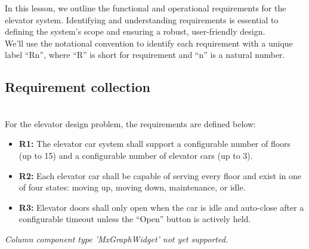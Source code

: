 

In this lesson, we outline the functional and operational requirements for the elevator system. Identifying and understanding requirements is essential to defining the system's scope and ensuring a robust, user-friendly design.
\\
We'll use the notational convention to identify each requirement with a unique label ``Rn'', where ``R'' is short for requirement and ``n'' is a natural number.

\subsection{Requirement collection}\label{T3-iWeexW0GlqHAyijyXI}
\\
For the elevator design problem, the requirements are defined below:

\noindent
\begin{minipage}[t]{0.48\textwidth}\vspace{0pt}
\begin{itemize}
\item
\textbf{R1:} The elevator car system shall support a configurable number of floors (up to 15) and a configurable number of elevator cars (up to 3).
\item
\textbf{R2:} Each elevator car shall be capable of serving every floor and exist in one of four states: moving up, moving down, maintenance, or idle.
\item
\textbf{R3:} Elevator doors shall only open when the car is idle and auto-close after a configurable timeout unless the ``Open'' button is actively held.
\end{itemize}
\end{minipage}
\hfill
\begin{minipage}[t]{0.48\textwidth}\vspace{0pt}
\textit{Column component type 'MxGraphWidget' not yet supported.}
\end{minipage}

